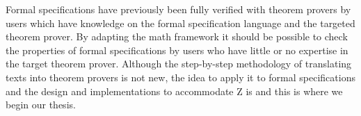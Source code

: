 Formal specifications have previously been fully verified with theorem provers
by users which have knowledge on the formal specification language and the
targeted theorem prover. By adapting the \gls{math} framework it should be
possible to check the properties of formal specifications by users who have
little or no expertise in the target theorem prover. Although the step-by-step
methodology of translating texts into theorem provers is not new, the idea to
apply it to formal specifications and the design and implementations to
accommodate Z is and this is where we begin our thesis.